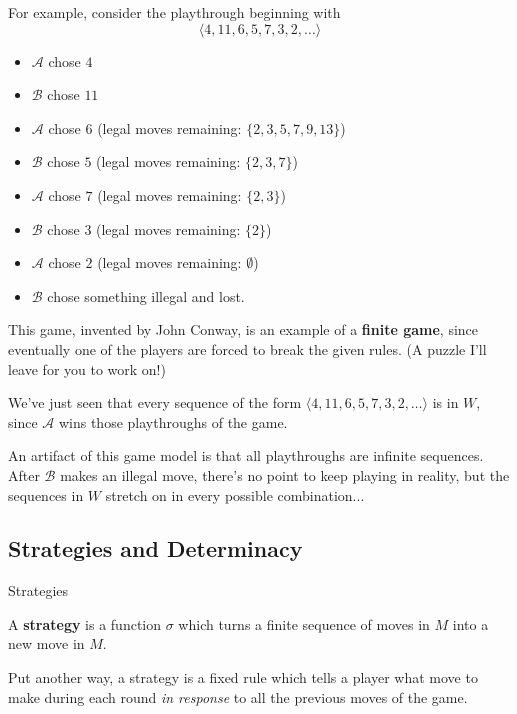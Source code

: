 \documentclass{beamer}
\theoremstyle{theorem}
\theoremstyle{definition}
\newcommand{\<}{\langle}
\renewcommand{\>}{\rangle}
\newcommand{\pl}[1]{\mathscr{#1}}
\newcommand{\vpause}{\pause\vspace{1em}}
\newcommand{\term}[1]{\textbf{#1}}
\begin{document}
\begin{frame}
  For example, consider the playthrough beginning with
  \[
    \<4,11,6,5,7,3,2,\dots\>
  \]
  \begin{itemize}
    \item $\pl A$ chose $4$
    \item $\pl B$ chose $11$
    \item $\pl A$ chose $6$ (legal moves remaining:
          $\{2,3,5,7,9,13\}$)
    \item $\pl B$ chose $5$ (legal moves remaining:
          $\{2,3,7\}$)
    \item $\pl A$ chose $7$ (legal moves remaining:
          $\{2,3\}$)
    \item $\pl B$ chose $3$ (legal moves remaining: $\{2\}$)
    \item $\pl A$ chose $2$ (legal moves remaining: $\emptyset$)
    \item $\pl B$ chose something illegal and lost.
  \end{itemize}
\end{frame}

\begin{frame}
  This game, invented by John Conway, is an example of a \term{finite game},
  since eventually one of the players are forced to break the given rules.
  (A puzzle I'll leave for you to work on!)

  \vpause

  We've just seen that every sequence of the form $\<4,11,6,5,7,3,2,\dots\>$
  is in $W$, since $\pl A$ wins those playthroughs of the game.

  \vpause

  An artifact of this game model is that all playthroughs are infinite
  sequences. After $\pl B$ makes an illegal move, there's no point to keep
  playing in reality, but the sequences in $W$ stretch on in every possible
  combination...
\end{frame}

\subsection{Strategies and Determinacy}

\begin{frame}{Strategies}
  \begin{definition}
    A \term{strategy} is a function $\sigma$ which turns a finite sequence
    of moves in $M$ into a new move in $M$.
  \end{definition}

  \pause

  Put another way, a strategy is a fixed rule which tells a player what move
  to make during each round \textit{in response} to all the previous moves
  of the game.
\end{frame}
\end{document}
